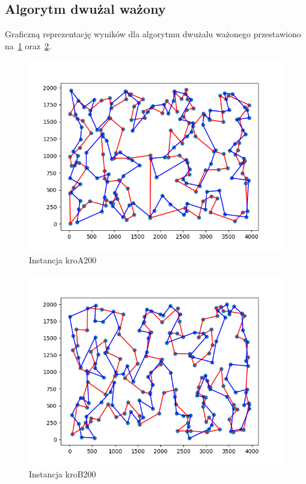 \documentclass[11pt]{article}
\begin{document}
\subsection{Algorytm dwużal ważony}\label{subsec:algorytm-dwużal-ważony}
Graficzną reprezentację wyników dla algorytmu dwużalu ważonego przestawiono na~\ref{fig:Two-regret-weighted-kroA} oraz~\ref{fig:Two-regret-weighted-kroB}.

\begin{figure}[H]
    \centering
    \includegraphics{best_paths/weighted_two_regret_kroA200.tsp.png}
    \caption{Instancja kroA200}
    \label{fig:Two-regret-weighted-kroA}
\end{figure}
\begin{figure}[H]
    \centering
    \includegraphics{best_paths/weighted_two_regret_kroB200.tsp.png}
    \caption{Instancja kroB200}
    \label{fig:Two-regret-weighted-kroB}
\end{figure}
\end{document}
